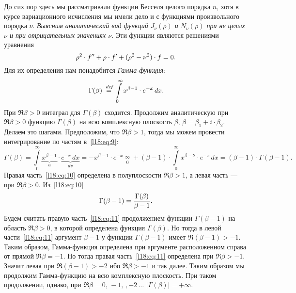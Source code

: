 До сих пор здесь мы рассматривали функции Бесселя целого порядка $n$, хотя в курсе вариационного исчисления мы имели дело и с функциями произвольного порядка $\nu$. \emph{Выясним аналитический вид функций $J_{\nu}(\rho)$ и $N_{\nu}(\rho)$ при не целых $\nu$ и при отрицательных значениях $\nu$.} Эти функции являются решениями уравнения 
\begin{equation}\label{l18:eq:8}
	\hfill\rho^2\cdot f''+\rho\cdot f'+(\rho^2-\nu^2)\cdot f=0.\hfill
\end{equation} 
Для их определения нам понадобится \emph{Гамма-функция}:
\begin{equation}\label{l18:eq:9}
	\hfill\Gamma(\beta)\eqdef\int\limits_{0}^{\infty}x^{\beta-1}\cdot e^{-x}\,dx.\hfill
\end{equation}
При $\Re\beta>0$ интеграл для $\Gamma(\beta)$ сходится. Продолжим аналитическую при $\Re\beta>0$ функцию $\Gamma(\beta)$ на всю комплексную плоскость $\beta$, $\beta=\beta_1+i\cdot\beta_2$. Делаем это шагами. Предположим, что $\Re\beta>1$, тогда мы можем провести интегрирование по частям в~\eqref{l18:eq:9}:
\begin{equation}\label{l18:eq:10}
	\Gamma(\beta)=\int\limits_{0}^{\infty}\underbrace{x^{\beta-1}}_{u}\cdot \underbrace{e^{-x}\,dx}_{dv}=-x^{\beta-1}\cdot e^{-x}\mathop{\Big|}\limits_{0}^{\infty}+(\beta-1)\cdot\int\limits_{0}^{\infty}x^{\beta-2}\cdot e^{-x}\,dx=(\beta-1)\cdot\Gamma(\beta-1).
\end{equation}
Правая часть~\eqref{l18:eq:10} определена в полуплоскости $\Re\beta>1$, а левая часть --- при $\Re\beta>0$. Из~\eqref{l18:eq:10}
\begin{equation}\label{l18:eq:11}
	\hfill\Gamma(\beta-1)=\frac{\Gamma(\beta)}{\beta-1}.\hfill
\end{equation}
Будем считать правую часть~\eqref{l18:eq:11} продолжением функции $\Gamma(\beta-1)$ на область $\Re\beta>0$, в которой определена функция $\Gamma(\beta)$. Но тогда в левой части~\eqref{l18:eq:11} аргумент $\beta-1$ у функции $\Gamma(\beta-1)$ имеет $\Re(\beta-1)>-1$. Таким образом, Гамма-функция определена при аргументе расположенном справа от прямой $\Re\beta=-1$. Но тогда правая часть~\eqref{l18:eq:11} определена при $\Re\beta>-1$. Значит левая при $\Re(\beta-1)>-2$ ибо $\Re\beta>-1$ и так далее. Таким образом мы продолжим Гамма-функцию на всю комплексную плоскость. При таком продолжении, однако, при $\Re\beta=0,\,-1,\,,-2\,\ldots$ $|\Gamma(\beta)|=+\infty$. 

